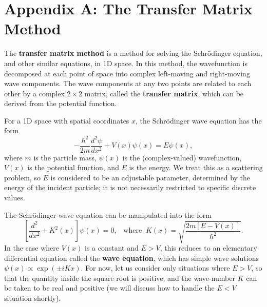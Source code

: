 \documentclass[pra,12pt]{revtex4}
\begin{document}
\section*{Appendix A: The Transfer Matrix Method}

The \textbf{transfer matrix method} is a method for solving the
Schr\"odinger equation, and other similar equations, in 1D space.  In
this method, the wavefunction is decomposed at each point of space
into complex left-moving and right-moving wave components.  The wave
components at any two points are related to each other by a complex
$2\times2$ matrix, called the \textbf{transfer matrix}, which can be
derived from the potential function.

For a 1D space with spatial coordinates $x$, the Schr\"odinger wave
equation has the form
$$-\frac{\hbar^2}{2m}\frac{d^2\psi}{dx^2} + V(x) \psi(x) = E\psi(x),$$
where $m$ is the particle mass, $\psi(x)$ is the (complex-valued)
wavefunction, $V(x)$ is the potential function, and $E$ is the energy.
We treat this as a scattering problem, so $E$ is considered to be an
adjustable parameter, determined by the energy of the incident
particle; it is not necessarily restricted to specific discrete
values.

The Schr\"odinger wave equation can be manipulated into the form
$$\left[\frac{d^2}{dx^2} + K^2(x)\right] \psi(x) = 0, \;\;\; \mathrm{where}\;\;K(x) = \sqrt{\frac{2m[E-V(x)]}{\hbar^2}}.$$
In the case where $V(x)$ is a constant and $E > V$, this reduces to an
elementary differential equation called the \textbf{wave equation},
which has simple wave solutions $\psi(x)\propto \exp(\pm iKx)$.  For
now, let us consider only situations where $E > V$, so that the
quantity inside the square root is positive, and the wave-number $K$
can be taken to be real and positive (we will discuss how to handle
the $E < V$ situation shortly).
\end{document}
